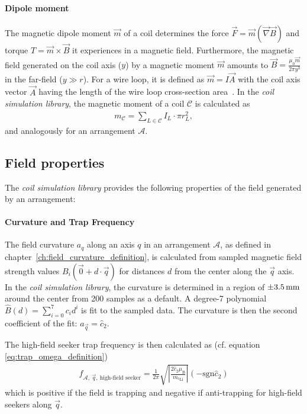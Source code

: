 \paragraph{Dipole moment}
The magnetic dipole moment $\vec m$ of a coil determines the force $\vec F = \vec m (\vec \nabla \vec B)$ and torque $T = \vec m \times \vec B$ it experiences in a magnetic field. Furthermore, the magnetic field generated on the coil axis ($y$) by a magnetic moment $\vec m$ amounts to $\vec B = \frac{\mu_0 \vec m}{2\pi y^3}$ in the far-field ($y \gg r$). For a wire loop, it is defined as $\vec m = I \vec A$ with the coil axis vector $\vec A$ having the length of the wire loop cross-section area~\cite{demtroder_statische_2013}. In the \textit{coil simulation library}, the magnetic moment of a coil $\mathcal{C}$ is calculated as
\begin{align}\label{eq:dipole_moment_simulation}
    m_\mathcal{C} = \sum\limits_{L \in \mathcal{C}} I_L \cdot \pi r_L^2,
\end{align}
and analogously for an arrangement $\mathcal{A}$.

\subsection*{Field properties}
The \textit{coil simulation library} provides the following properties of the field generated by an arrangement:

\paragraph{Curvature and Trap Frequency}
The field curvature $a_q$ along an axis $q$ in an arrangement $\mathcal{A}$, as defined in chapter~\ref{ch:field_curvature_definition}, is calculated from sampled magnetic field strength values $B_i(\vec 0 + d \cdot \vec q)$ for distances $d$ from the center along the $\vec q$ axis. In the \textit{coil simulation library}, the curvature is determined in a region of $\SI{+-3.5}{\milli\meter}$ around the center from \SI{200}{} samples as a default. A degree-7 polynomial $\hat B(d) = \sum\limits_{i=0}^7 c_i d^i$ is fit to the sampled data. The curvature is then the second coefficient of the fit: $a_{\vec q} = \hat c_2$.

The high-field seeker trap frequency is then calculated as (cf. equation \ref{eq:trap_omega_definition})
\begin{align}\label{eq:trap_frequency_simulation}
    f_{\mathcal{A},~\vec q,~\text{high-field seeker}} = \frac{1}{2\pi}  \sqrt{\left| \frac{2 \hat c_2 \mu_\text{B}}{m_{^6\text{Li}}} \right|} (-\mathrm{sgn} \hat c_2)
\end{align}
which is positive if the field is trapping and negative if anti-trapping for high-field seekers along $\vec q$.

